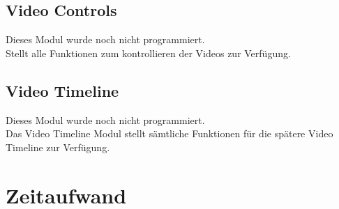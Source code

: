 \documentclass[a4paper,10pt]{scrartcl}
\begin{document}
\subsection{Video Controls}
Dieses Modul wurde noch nicht programmiert.\\
Stellt alle Funktionen zum kontrollieren der Videos zur Verfügung.
\subsection{Video Timeline}
Dieses Modul wurde noch nicht programmiert.\\
Das Video Timeline Modul stellt sämtliche Funktionen für die spätere Video Timeline zur Verfügung. 
\newpage
\section{Zeitaufwand}
\end{document}
